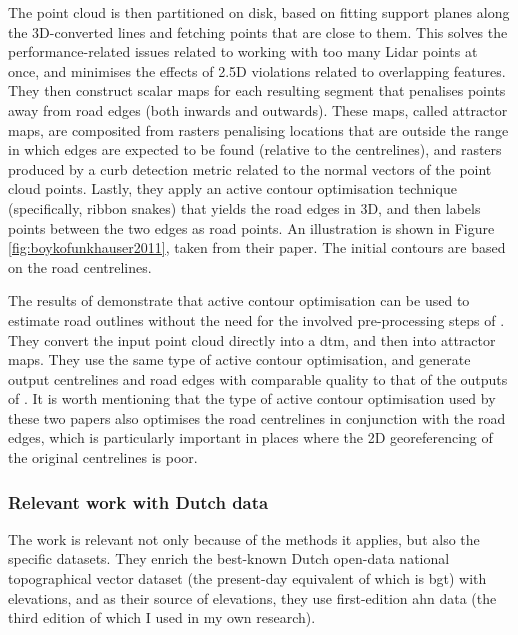 The point cloud is then partitioned on disk, based on fitting support planes along the 3D-converted lines and fetching points that are close to them. This solves the performance-related issues related to working with too many Lidar points at once, and minimises the effects of 2.5D violations related to overlapping features. They then construct scalar maps for each resulting segment that penalises points away from road edges (both inwards and outwards). These maps, called attractor maps, are composited from rasters penalising locations that are outside the range in which edges are expected to be found (relative to the centrelines), and rasters produced by a curb detection metric related to the normal vectors of the point cloud points. Lastly, they apply an active contour optimisation technique (specifically, ribbon snakes) that yields the road edges in 3D, and then labels points between the two edges as road points. An illustration is shown in Figure \ref{fig:boykofunkhauser2011}, taken from their paper. The initial contours are based on the road centrelines.

The results of \cite{gopfert_etal_2011} demonstrate that active contour optimisation can be used to estimate road outlines without the need for the involved pre-processing steps of \cite{boyko_funkhauser_2011}. They convert the input point cloud directly into a \ac{dtm}, and then into attractor maps. They use the same type of active contour optimisation, and generate output centrelines and road edges with comparable quality to that of the outputs of \cite{boyko_funkhauser_2011}. It is worth mentioning that the type of active contour optimisation used by these two papers also optimises the road centrelines in conjunction with the road edges, which is particularly important in places where the 2D georeferencing of the original centrelines is poor.

\subsubsection{Relevant work with Dutch data}

The work \cite{oudeElberink_vosselman_2006} is relevant not only because of the methods it applies, but also the specific datasets. They enrich the best-known Dutch open-data national topographical vector dataset (the present-day equivalent of which is \ac{bgt}) with elevations, and as their source of elevations, they use first-edition \ac{ahn} data (the third edition of which I used in my own research).

